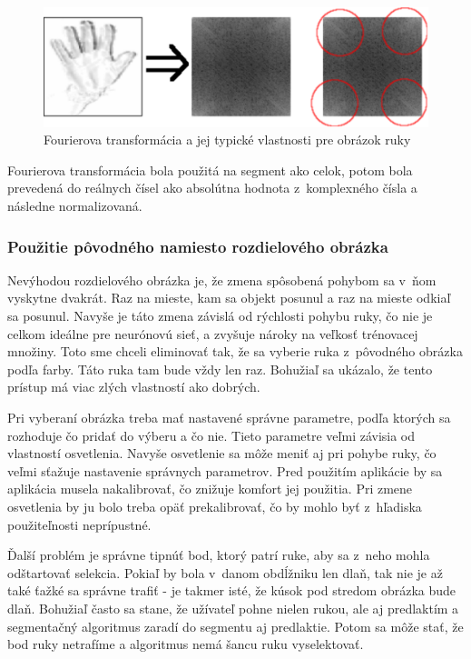 \begin{figure}[htp]
    \centering
    \includegraphics[width=\textwidth]{images/fft_preview}
    \caption{Fourierova transformácia a jej typické vlastnosti pre obrázok ruky}
    \label{fig:fft}
\end{figure}

Fourierova transformácia bola použitá na segment ako celok, potom bola prevedená do reálnych čísel ako absolútna hodnota z~komplexného čísla a následne normalizovaná.

\subsubsection{Použitie pôvodného namiesto rozdielového obrázka}
Nevýhodou rozdielového obrázka je, že zmena spôsobená pohybom sa v~ňom vyskytne dvakrát. Raz na mieste, kam sa objekt posunul a raz na mieste odkiaľ sa posunul. Navyše je táto zmena závislá od rýchlosti pohybu ruky, čo nie je celkom ideálne pre neurónovú sieť, a zvyšuje nároky na veľkosť trénovacej množiny. Toto sme chceli eliminovať tak, že sa vyberie ruka z~pôvodného obrázka podľa farby. Táto ruka tam bude vždy len raz. Bohužiaľ sa ukázalo, že tento prístup má viac zlých vlastností ako dobrých.

Pri vyberaní obrázka treba mať nastavené správne parametre, podľa ktorých sa rozhoduje čo pridať do výberu a čo nie. Tieto parametre veľmi závisia od vlastností osvetlenia. Navyše osvetlenie sa môže meniť aj pri pohybe ruky, čo veľmi sťažuje nastavenie správnych parametrov. Pred použitím aplikácie by sa aplikácia musela nakalibrovať, čo znižuje komfort jej použitia. Pri zmene osvetlenia by ju bolo treba opäť prekalibrovať, čo by mohlo byť z~hľadiska použiteľnosti neprípustné.

Ďalší problém je správne tipnúť bod, ktorý patrí ruke, aby sa z~neho mohla odštartovať selekcia. Pokiaľ by bola v~danom obdĺžniku len dlaň, tak nie je až také ťažké sa správne trafiť - je takmer isté, že kúsok pod stredom obrázka bude dlaň. Bohužiaľ často sa stane, že užívateľ pohne nielen rukou, ale aj predlaktím a segmentačný algoritmus zaradí do segmentu aj predlaktie. Potom sa môže stať, že bod ruky netrafíme a algoritmus nemá šancu ruku vyselektovať.

